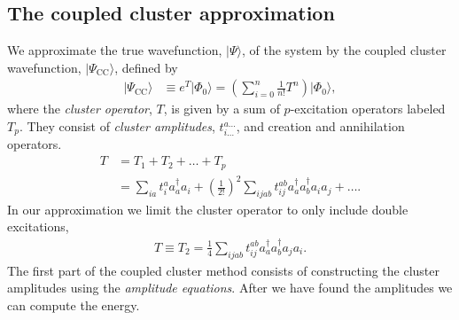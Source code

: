 \documentclass[
    a4paper, aps, twocolumn, floatfix, superscriptaddress,
    nofootinbib]{revtex4-1}
\newcommand{\1}{\mathds{1}}
\newcommand{\para}[1]{\left(#1\right)}
\newcommand{\ket}[1]{\rvert #1\rangle}
\newcommand{\acr}[1]{a_{#1}^{\dagger}}
\newcommand{\ade}[1]{a_{#1}}
\begin{document}
    \subsection{The coupled cluster approximation}
        We approximate the true wavefunction, $\ket{\Psi}$, of the system by the
        coupled cluster wavefunction, $\ket{\Psi_{\text{CC}}}$, defined by
        \begin{align}
            \ket{\Psi_{\text{CC}}}
            &\equiv e^{T}\ket{\Phi_0}
            = \para{
                \sum_{i = 0}^n
                \frac{1}{n!}T^n
            }\ket{\Phi_0},
        \end{align}
        where the \emph{cluster operator}, $T$, is given by a sum of
        $p$-excitation operators labeled $T_p$. They consist of \emph{cluster
        amplitudes}, $t_{i\dots}^{a\dots}$, and creation and annihilation
        operators.
        \begin{align}
            T &= T_1 + T_2 + \dots + T_p \\
            &=
            \sum_{ia}t_i^a\acr{a}\ade{i}
            + \para{\frac{1}{2!}}^2\sum_{ijab}
            t_{ij}^{ab}\acr{a}\acr{b}\ade{i}\ade{j}
            + \dots.
        \end{align}
        In our approximation we limit the cluster operator to only include
        double excitations,
        \begin{align}
            T \equiv T_2
            = \frac{1}{4}\sum_{ijab}t_{ij}^{ab}\acr{a}\acr{b}\ade{j}\ade{i}.
            \label{eq:T_2}
        \end{align}
        The first part of the coupled cluster method consists of constructing
        the cluster amplitudes using the \emph{amplitude equations}. After we
        have found the amplitudes we can compute the energy.
\end{document}
